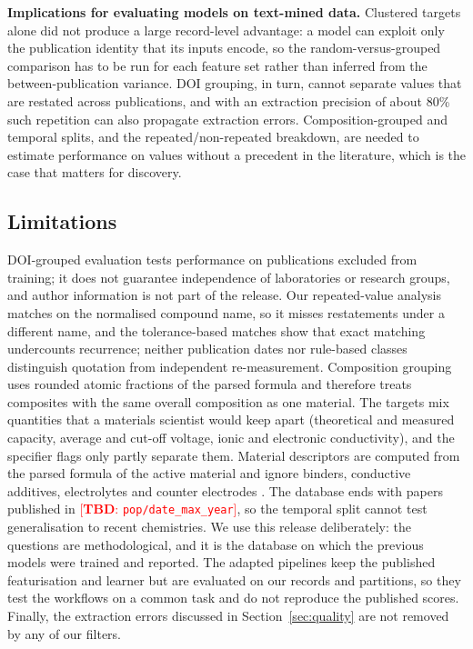 \documentclass[journal=jcisd8,manuscript=article,layout=traditional]{achemso}
\newcommand{\TBD}[1]{\textcolor{red}{[\textbf{TBD}: \nolinkurl{#1}]}}
\begin{document}
\textbf{Implications for evaluating models on text-mined data.} Clustered targets alone did not produce a large record-level advantage: a model can exploit only the publication identity that its inputs encode, so the random-versus-grouped comparison has to be run for each feature set rather than inferred from the between-publication variance. DOI grouping, in turn, cannot separate values that are restated across publications, and with an extraction precision of about 80\% such repetition can also propagate extraction errors. Composition-grouped and temporal splits, and the repeated/non-repeated breakdown, are needed to estimate performance on values without a precedent in the literature, which is the case that matters for discovery.

\subsection{Limitations}
\label{sec:limitations}

DOI-grouped evaluation tests performance on publications excluded from training; it does not guarantee independence of laboratories or research groups, and author information is not part of the release. Our repeated-value analysis matches on the normalised compound name, so it misses restatements under a different name, and the tolerance-based matches show that exact matching undercounts recurrence; neither publication dates nor rule-based classes distinguish quotation from independent re-measurement. Composition grouping uses rounded atomic fractions of the parsed formula and therefore treats composites with the same overall composition as one material. The targets mix quantities that a materials scientist would keep apart (theoretical and measured capacity, average and cut-off voltage, ionic and electronic conductivity), and the specifier flags only partly separate them. Material descriptors are computed from the parsed formula of the active material and ignore binders, conductive additives, electrolytes and counter electrodes \cite{kauwe2019battery}. The database ends with papers published in \TBD{pop/date_max_year}, so the temporal split cannot test generalisation to recent chemistries. We use this release deliberately: the questions are methodological, and it is the database on which the previous models were trained and reported. The adapted pipelines keep the published featurisation and learner but are evaluated on our records and partitions, so they test the workflows on a common task and do not reproduce the published scores. Finally, the extraction errors discussed in Section~\ref{sec:quality} are not removed by any of our filters.
\end{document}
